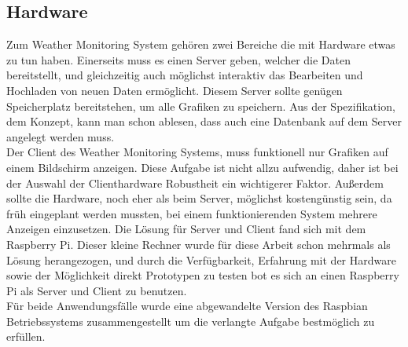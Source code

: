 \subsection{Hardware}
Zum Weather Monitoring System gehören zwei Bereiche die mit Hardware etwas zu tun haben.
Einerseits muss es einen Server geben, welcher die Daten bereitstellt,
und gleichzeitig auch möglichst interaktiv das Bearbeiten und Hochladen von neuen Daten ermöglicht.
Diesem Server sollte genügen Speicherplatz bereitstehen,
um alle Grafiken zu speichern.
Aus der Spezifikation, dem Konzept, kann man schon ablesen, dass auch eine Datenbank auf dem
Server angelegt werden muss.\\
Der Client des Weather Monitoring Systems, muss funktionell nur Grafiken auf einem Bildschirm anzeigen.
Diese Aufgabe ist nicht allzu aufwendig,
daher ist bei der Auswahl der Clienthardware Robustheit ein wichtigerer Faktor.
Außerdem sollte die Hardware, noch eher als beim Server, möglichst kostengünstig sein,
da früh eingeplant werden mussten,
bei einem funktionierenden System mehrere Anzeigen einzusetzen.
Die Lösung für Server und Client fand sich mit dem Raspberry Pi.
Dieser kleine Rechner wurde für diese Arbeit schon mehrmals als Lösung herangezogen,
und durch die Verfügbarkeit,
Erfahrung mit der Hardware sowie der Möglichkeit direkt Prototypen
zu testen bot es sich an einen Raspberry Pi als Server und Client zu benutzen.\\
Für beide Anwendungsfälle wurde eine abgewandelte
Version des Raspbian Betriebssystems zusammengestellt
um die verlangte Aufgabe bestmöglich zu erfüllen.


